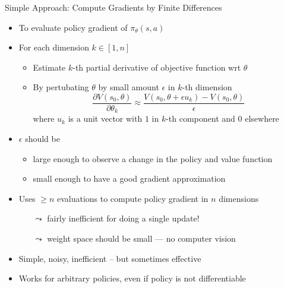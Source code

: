 \begin{frame}[c]{Simple Approach: Compute Gradients by Finite Differences}
	
	\begin{itemize}
		\item To evaluate policy gradient of $\pi_\theta(s,a)$
		\item For each dimension $k\in [1,n]$
		\begin{itemize}
			\item Estimate $k$-th partial derivative of objective function wrt $\theta$
			\item By pertubating $\theta$ by small amount $\epsilon$ in $k$-th dimension
			$$\frac{\partial V(s_0, \theta)}{\partial \theta_k} \approx \frac{V(s_0, \theta + \epsilon u_k) - V(s_0, \theta)}{\epsilon} $$
			where $u_k$ is a unit vector with $1$ in $k$-th component and $0$ elsewhere
		\end{itemize}
		\pause
		\item $\epsilon$ should be
		\begin{itemize}
			\item large enough to observe a change in the policy and value function
			\item small enough to have a good gradient approximation
		\end{itemize}
		\pause
		\item Uses $\geq n$ evaluations to compute policy gradient in $n$ dimensions
		\begin{itemize}
			\item[$\leadsto$] fairly inefficient for doing a single update!
			\item[$\leadsto$] weight space should be small --- no computer vision
		\end{itemize}
		\pause
		\item Simple, noisy, inefficient -- but sometimes effective
		\item Works for arbitrary policies, even if policy is not differentiable
	\end{itemize}
	
\end{frame}

